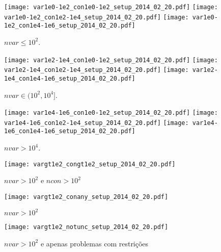 \documentclass{article}
\begin{document}
\begin{figure}[H]
\centering
\texttt{[image: var1e0-1e2\_con1e0-1e2\_setup\_2014\_02\_20.pdf]}
\texttt{[image: var1e0-1e2\_con1e2-1e4\_setup\_2014\_02\_20.pdf]}
\texttt{[image: var1e0-1e2\_con1e4-1e6\_setup\_2014\_02\_20.pdf]}
\caption{ $nvar \leq 10^2$. }
\label{fig:nvar_small}
\end{figure}
\begin{figure}[H]
\centering
\texttt{[image: var1e2-1e4\_con1e0-1e2\_setup\_2014\_02\_20.pdf]}
\texttt{[image: var1e2-1e4\_con1e2-1e4\_setup\_2014\_02\_20.pdf]}
\texttt{[image: var1e2-1e4\_con1e4-1e6\_setup\_2014\_02\_20.pdf]}
\caption{ $nvar \in (10^2,10^4]$. }
\label{fig:nvar_medium}
\end{figure}
\begin{figure}[H]
\centering
\texttt{[image: var1e4-1e6\_con1e0-1e2\_setup\_2014\_02\_20.pdf]}
\texttt{[image: var1e4-1e6\_con1e2-1e4\_setup\_2014\_02\_20.pdf]}
\texttt{[image: var1e4-1e6\_con1e4-1e6\_setup\_2014\_02\_20.pdf]}
\caption{ $nvar > 10^4$. }
\label{fig:nvar_big}
\end{figure}

\begin{figure}[H]
\centering
\texttt{[image: vargt1e2\_congt1e2\_setup\_2014\_02\_20.pdf]}
\caption{ $nvar > 10^2$ e $ncon > 10^2$ }
\label{fig:both_medium_and_big}
\end{figure}

\begin{figure}[H]
\centering
\texttt{[image: vargt1e2\_conany\_setup\_2014\_02\_20.pdf]}
\caption{ $nvar > 10^2$ }
\label{fig:nvar_medium_and_big}
\end{figure}

\begin{figure}[H]
\centering
\texttt{[image: vargt1e2\_notunc\_setup\_2014\_02\_20.pdf]}
\caption{ $nvar > 10^2$ e apenas problemas com restrições }
\label{fig:nvar_medium_and_big_not_unc}
\end{figure}
\end{document}
